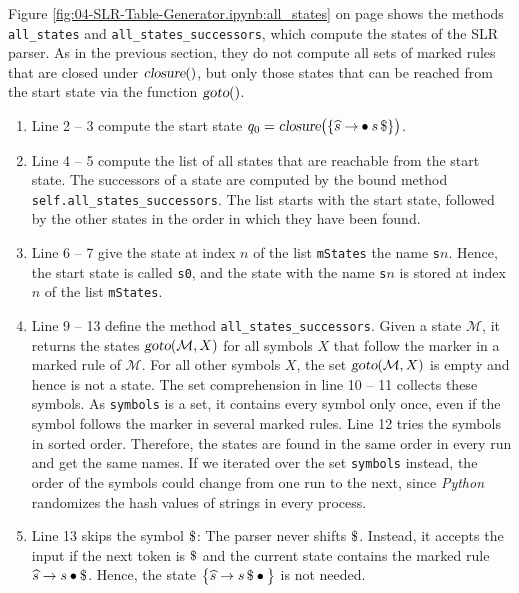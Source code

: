 \noindent
Figure \ref{fig:04-SLR-Table-Generator.ipynb:all_states} on page \pageref{fig:04-SLR-Table-Generator.ipynb:all_states}
shows the methods \texttt{all\_states} and \texttt{all\_states\_successors}, which compute the states of the SLR
parser.  As in the previous section, they
do not compute all sets of marked rules that are closed under $\textsl{closure}()$, but only those states that
can be reached from the start state via the function $\textsl{goto}()$.
\begin{enumerate}
\item Line 2 -- 3 compute the start state
      $q_0 = \textsl{closure}\bigl(\{ \widehat{s} \rightarrow \mdot s\, \symbol{36} \}\bigr)$.
\item Line 4 -- 5 compute the list of all states that are reachable from the start state.  The successors of a state
      are computed by the bound method \texttt{self.all\_states\_successors}.  The list starts with the start
      state, followed by the other states in the order in which they have been found.
\item Line 6 -- 7 give the state at index $n$ of the list \texttt{mStates} the name \texttt{s}$n$.  Hence, the
      start state is called \texttt{s0}, and the state with the name \texttt{s}$n$ is stored at index $n$ of the
      list \texttt{mStates}.
\item Line 9 -- 13 define the method \texttt{all\_states\_successors}.  Given a state $\mathcal{M}$, it returns the
      states $\textsl{goto}(\mathcal{M}, X)$ for all symbols $X$ that follow the marker in a marked rule of
      $\mathcal{M}$.  For all other symbols $X$, the set $\textsl{goto}(\mathcal{M}, X)$ is empty and hence is not
      a state.  The set comprehension in line 10 -- 11 collects these symbols.  As \texttt{symbols} is a set, it
      contains every symbol only once, even if the symbol follows the marker in several marked rules.  Line 12
      tries the symbols in sorted order.  Therefore, the states are found in the same order in every run and get
      the same names.  If we iterated over the set \texttt{symbols} instead, the order of the symbols could change
      from one run to the next, since \textsl{Python} randomizes the hash values of strings in every process.
\item Line 13 skips the symbol $\symbol{36}$:  The parser never shifts $\symbol{36}$.  Instead, it accepts the
      input if the next token is $\symbol{36}$ and the current state contains the marked rule
      $\widehat{s} \rightarrow s \mdot \symbol{36}$.  Hence, the state
      $\bigl\{ \widehat{s} \rightarrow s\, \symbol{36} \mdot \bigr\}$ is not needed.
\end{enumerate}

